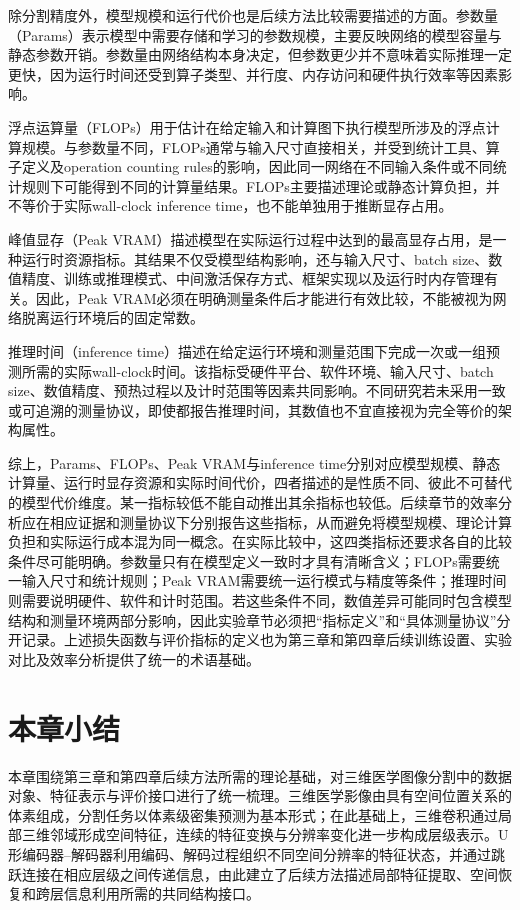 除分割精度外，模型规模和运行代价也是后续方法比较需要描述的方面。参数量（Params）表示模型中需要存储和学习的参数规模，主要反映网络的模型容量与静态参数开销。参数量由网络结构本身决定，但参数更少并不意味着实际推理一定更快，因为运行时间还受到算子类型、并行度、内存访问和硬件执行效率等因素影响。

浮点运算量（FLOPs）用于估计在给定输入和计算图下执行模型所涉及的浮点计算规模。与参数量不同，FLOPs通常与输入尺寸直接相关，并受到统计工具、算子定义及operation counting rules的影响，因此同一网络在不同输入条件或不同统计规则下可能得到不同的计算量结果。FLOPs主要描述理论或静态计算负担，并不等价于实际wall-clock inference time，也不能单独用于推断显存占用。

峰值显存（Peak VRAM）描述模型在实际运行过程中达到的最高显存占用，是一种运行时资源指标。其结果不仅受模型结构影响，还与输入尺寸、batch size、数值精度、训练或推理模式、中间激活保存方式、框架实现以及运行时内存管理有关。因此，Peak VRAM必须在明确测量条件后才能进行有效比较，不能被视为网络脱离运行环境后的固定常数。

推理时间（inference time）描述在给定运行环境和测量范围下完成一次或一组预测所需的实际wall-clock时间。该指标受硬件平台、软件环境、输入尺寸、batch size、数值精度、预热过程以及计时范围等因素共同影响。不同研究若未采用一致或可追溯的测量协议，即使都报告推理时间，其数值也不宜直接视为完全等价的架构属性。

综上，Params、FLOPs、Peak VRAM与inference time分别对应模型规模、静态计算量、运行时显存资源和实际时间代价，四者描述的是性质不同、彼此不可替代的模型代价维度。某一指标较低不能自动推出其余指标也较低。后续章节的效率分析应在相应证据和测量协议下分别报告这些指标，从而避免将模型规模、理论计算负担和实际运行成本混为同一概念。在实际比较中，这四类指标还要求各自的比较条件尽可能明确。参数量只有在模型定义一致时才具有清晰含义；FLOPs需要统一输入尺寸和统计规则；Peak VRAM需要统一运行模式与精度等条件；推理时间则需要说明硬件、软件和计时范围。若这些条件不同，数值差异可能同时包含模型结构和测量环境两部分影响，因此实验章节必须把“指标定义”和“具体测量协议”分开记录。上述损失函数与评价指标的定义也为第三章和第四章后续训练设置、实验对比及效率分析提供了统一的术语基础。

\section{本章小结}

本章围绕第三章和第四章后续方法所需的理论基础，对三维医学图像分割中的数据对象、特征表示与评价接口进行了统一梳理。三维医学影像由具有空间位置关系的体素组成，分割任务以体素级密集预测为基本形式；在此基础上，三维卷积通过局部三维邻域形成空间特征，连续的特征变换与分辨率变化进一步构成层级表示。U形编码器--解码器利用编码、解码过程组织不同空间分辨率的特征状态，并通过跳跃连接在相应层级之间传递信息，由此建立了后续方法描述局部特征提取、空间恢复和跨层信息利用所需的共同结构接口。

